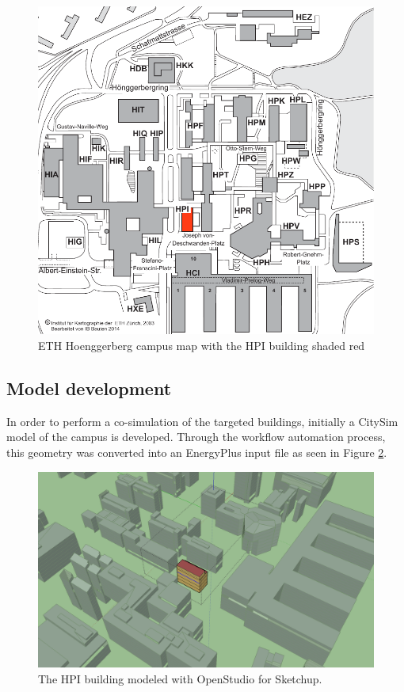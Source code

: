 \documentclass{tBPS2e}
\theoremstyle{plain}
\theoremstyle{definition}
\theoremstyle{remark}
\begin{document}
\begin{figure}[H]
\centering
\includegraphics[scale=0.5]{figures/ETH_Hoenngerbergcamp_targetedbuildings_HPI}
\caption{ETH Hoenggerberg campus map with the HPI building shaded red}
\label{fig:campusmap}
\end{figure}

\subsection{Model development}
In order to perform a co-simulation of the targeted buildings, initially a CitySim model of the campus is developed. Through the workflow automation process, this geometry was converted into an EnergyPlus input file as seen in Figure \ref{fig:HPIcampus}. 

\begin{figure}[H]
\centering
\includegraphics[scale=0.2]{figures/HPI_Campus.png}
\caption{The HPI building modeled with OpenStudio for Sketchup.}
\label{fig:HPIcampus}
\end{figure}
\end{document}
